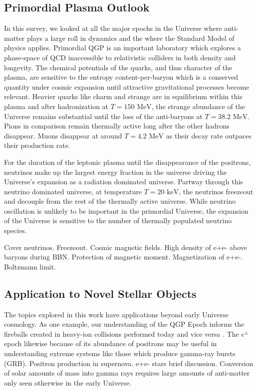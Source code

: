 \documentclass[universe,article,submit,moreauthors,pdftex,a4paper]{Definitions/mdpi}
\newcommand{\MeV}{\text{ MeV}}
\newcommand{\keV}{\text{ keV}}
\newcommand*{\xred}{\color{red}}
\begin{document}
\subsection{Primordial Plasma Outlook}
\noindent In this survey, we looked at all the major epochs in the Universe where anti-matter plays a large roll in dynamics and the where the Standard Model of physics applies. Primordial QGP is an important laboratory which explores a phase-space of QCD inaccessible to relativistic colliders in both density and longevity. The chemical potentials of the quarks, and thus character of the plasma, are sensitive to the entropy content-per-baryon which is a conserved quantity under cosmic expansion until attractive gravitational processes become relevant. Heavier quarks like charm and strange are in equilibrium within this plasma and after hadronization at $T=150\MeV$, the strange abundance of the Universe remains substantial until the loss of the anti-baryons at $T=38.2\MeV$. Pions in comparison remain thermally active long after the other hadrons disappear. Muons disappear at around $T=4.2\MeV$ as their decay rate outpaces their production rate.

For the duration of the leptonic plasma until the disappearance of the positrons, neutrinos make up the largest energy fraction in the universe driving the Universe's expansion as a radiation dominated universe. Partway through this neutrino dominated universe, at temperature $T=20\keV$, the neutrinos freezeout and decouple from the rest of the thermally active universe. While neutrino oscillation is unlikely to be important in the primordial Universe, the expansion of the Universe is sensitive to the number of thermally populated neutrino species.

{\xred Cover neutrinos. Freezeout. Cosmic magnetic fields. High density of e+e- above baryons during BBN. Protection of magnetic moment. Magnetization of e+e-. Boltzmann limit.}
\subsection{Application to Novel Stellar Objects}
\noindent The topics explored in this work have applications beyond early Universe cosmology. As one example, our understanding of the QGP Epoch informs the fireballs created in heavy-ion collisions performed today and vice versa \cite{Rafelski:2013qeu,Philipsen:2012nu,Braun-Munzinger:2008szb}. The $e^{\pm}$ epoch likewise because of its abundance of positrons may be useful in understanding extreme systems like those which produce gamma-ray bursts (GRB).
{\xred Positron production in supernova. e+e- stars brief discussion. Conversion of solar amounts of mass into gamma rays requires large amounts of anti-matter only seen otherwise in the early Universe.}
\end{document}

